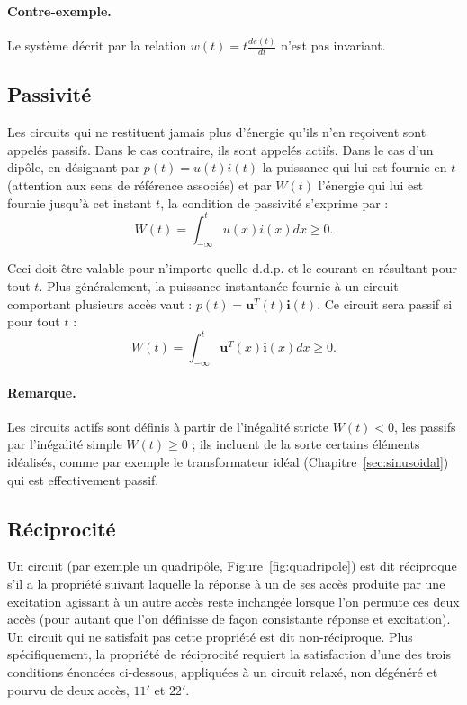 \paragraph{Contre-exemple.} Le système décrit par la relation $w(t) = t \frac{de(t)}{dt}$ n'est pas invariant.

\subsection{Passivité}
Les circuits qui ne restituent jamais plus d'énergie qu'ils n'en reçoivent sont appelés passifs. Dans le cas contraire, ils sont appelés actifs.
Dans le cas d'un dipôle, en désignant par $p(t) = u(t) i(t)$ la puissance qui lui est
fournie en $t$ (attention aux sens de référence associés) et par $W(t)$ l'énergie qui lui est fournie jusqu'à cet instant $t$, la condition de passivité s'exprime par :
$$ W(t) = \int_{-\infty}^t u(x) i(x) dx \ge 0.$$

Ceci doit être valable pour n'importe quelle d.d.p. et le courant en résultant pour tout $t$.
Plus généralement, la puissance instantanée fournie à un circuit comportant plusieurs accès vaut :
$p(t) = \mathbf{u}^T(t)\mathbf{i}(t)$.
Ce circuit sera passif si pour tout $t$ :
$$ W(t) = \int_{-\infty}^t \mathbf{u}^T(x) \mathbf{i}(x) dx \ge 0.$$

\paragraph{Remarque.} Les circuits actifs sont définis à partir de l'inégalité stricte $W(t) < 0$,
les passifs par l'inégalité simple $W(t) \ge 0$ ; ils incluent de la sorte certains éléments idéalisés, comme par exemple le transformateur idéal (Chapitre~\ref{sec:sinusoidal}) qui est effectivement passif.

\subsection{Réciprocité}
Un circuit (par exemple un quadripôle, Figure~\ref{fig:quadripole}) est dit réciproque s'il a la propriété suivant laquelle la réponse à un de ses accès produite par une excitation agissant à un autre accès reste inchangée lorsque l'on permute ces deux accès (pour autant que l'on définisse de façon consistante réponse et excitation). Un circuit qui ne satisfait pas cette propriété est dit non-réciproque.
Plus spécifiquement, la propriété de réciprocité requiert la satisfaction d'une des trois conditions énoncées ci-dessous, appliquées à un circuit relaxé, non dégénéré et pourvu de deux accès, $11'$ et $22'$. 

